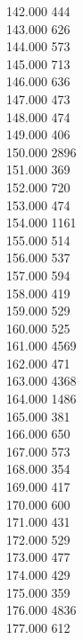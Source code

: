 { 142.000	444 \\
 143.000	626 \\
 144.000	573 \\
 145.000	713 \\
 146.000	636 \\
 147.000	473 \\
 148.000	474 \\
 149.000	406 \\
 150.000	2896 \\
 151.000	369 \\
 152.000	720 \\
 153.000	474 \\
 154.000	1161 \\
 155.000	514 \\
 156.000	537 \\
 157.000	594 \\
 158.000	419 \\
 159.000	529 \\
 160.000	525 \\
 161.000	4569 \\
 162.000	471 \\
 163.000	4368 \\
 164.000	1486 \\
 165.000	381 \\
 166.000	650 \\
 167.000	573 \\
 168.000	354 \\
 169.000	417 \\
 170.000	600 \\
 171.000	431 \\
 172.000	529 \\
 173.000	477 \\
 174.000	429 \\
 175.000	359 \\
 176.000	4836 \\
 177.000	612 \\
}
